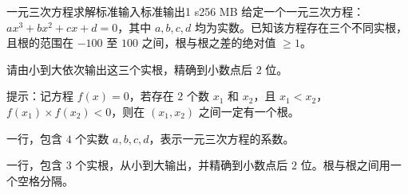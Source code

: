 \begin{problem}{一元三次方程求解}{标准输入}{标准输出}{1 s}{256 MB}
给定一个一元三次方程：$a x^3 + b x^2 + c x + d = 0$，其中 $a,b,c,d$ 均为实数。已知该方程存在三个不同实根，且根的范围在 $-100$ 至 $100$ 之间，根与根之差的绝对值 $\ge 1$。

请由小到大依次输出这三个实根，精确到小数点后 $2$ 位。

提示：记方程 $f(x) = 0$，若存在 $2$ 个数 $x_1$ 和 $x_2$，且 $x_1 < x_2$，$f(x_1) \times f(x_2) < 0$，则在 $(x_1, x_2)$ 之间一定有一个根。

\InputFile
一行，包含 $4$ 个实数 $a, b, c, d$，表示一元三次方程的系数。

\OutputFile
一行，包含 $3$ 个实根，从小到大输出，并精确到小数点后 $2$ 位。根与根之间用一个空格分隔。

\Example

\begin{example}
\end{example}

\end{problem}
